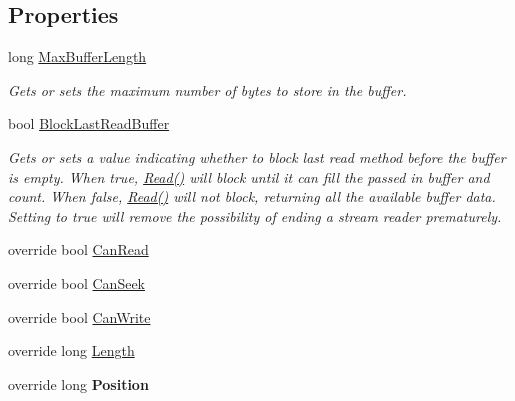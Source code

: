 \subsection*{Properties}
\begin{DoxyCompactItemize}
\item 
long \mbox{\hyperlink{class_a_d_l_1_1_pipe_stream_a250f42c7da667f60487068e27c3d67d0}{Max\+Buffer\+Length}}
\begin{DoxyCompactList}\small\item\em Gets or sets the maximum number of bytes to store in the buffer. \end{DoxyCompactList}\item 
bool \mbox{\hyperlink{class_a_d_l_1_1_pipe_stream_af05e530e849bfee481290e8139f27379}{Block\+Last\+Read\+Buffer}}
\begin{DoxyCompactList}\small\item\em Gets or sets a value indicating whether to block last read method before the buffer is empty. When true, \mbox{\hyperlink{class_a_d_l_1_1_pipe_stream_ada829c0b71d6896e2bb3cd5d37ccba34}{Read()}} will block until it can fill the passed in buffer and count. When false, \mbox{\hyperlink{class_a_d_l_1_1_pipe_stream_ada829c0b71d6896e2bb3cd5d37ccba34}{Read()}} will not block, returning all the available buffer data. Setting to true will remove the possibility of ending a stream reader prematurely. \end{DoxyCompactList}\item 
override bool \mbox{\hyperlink{class_a_d_l_1_1_pipe_stream_a194eae1c5b19a0999a5d12bcef00efd9}{Can\+Read}}
\item 
override bool \mbox{\hyperlink{class_a_d_l_1_1_pipe_stream_ad891fa332a41aeb44026c5a89ddc36e8}{Can\+Seek}}
\item 
override bool \mbox{\hyperlink{class_a_d_l_1_1_pipe_stream_a24b173b85db2cb2c76c8688086e6aebb}{Can\+Write}}
\item 
override long \mbox{\hyperlink{class_a_d_l_1_1_pipe_stream_a4c9f83e98008f203c5535ad730ca0614}{Length}}
\item 
\mbox{\label{class_a_d_l_1_1_pipe_stream_ae0cdcae01baf4b9cab2e947e1e38e284}} 
override long {\bfseries Position}
\end{DoxyCompactItemize}
